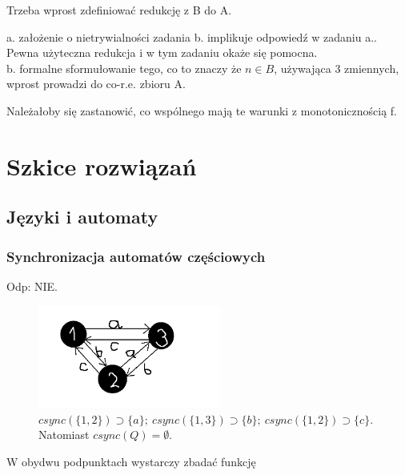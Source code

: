 \documentclass[a4paper,11pt]{article}
\newenvironment{zadanie}[1]
  {\renewcommand\theinnercustomthm{#1}\innercustomthm}
  {\endinnercustomthm}
\begin{document}
\begin{zadanie}{101}
Trzeba wprost zdefiniować redukcję z B do A. 
\end{zadanie}

\begin{zadanie}{102}
a. założenie o nietrywialności zadania b. implikuje odpowiedź w zadaniu a.. Pewna użyteczna redukcja i w tym zadaniu okaże się
pomocna. \\
b. formalne sformułowanie tego, co to znaczy że $n \in B$, używająca 3 zmiennych, wprost prowadzi do co-r.e. zbioru A.
\end{zadanie}

\begin{zadanie}{103}
Należałoby się zastanowić, co wspólnego mają te warunki z monotonicznością f.
\end{zadanie}

\section{Szkice rozwiązań}

\subsection{Języki i automaty}

\subsubsection{Synchronizacja automatów częściowych}

\begin{zadanie}{40}
\end{zadanie}

Odp: NIE. \\


\begin{figure}[h!]
  \centerline{%
    \includegraphics[width=6cm]{zad40.png}%
  }%
  \caption{$csync(\{1,2\}) \supset \{a\}; \ csync(\{1,3\}) \supset \{b\};\ csync(\{1,2\}) \supset \{c\}$. Natomiast $csync(Q) = \emptyset $.}
\end{figure}


\begin{zadanie}{41}
\end{zadanie}
W obydwu podpunktach wystarczy zbadać funkcję
\end{document}
